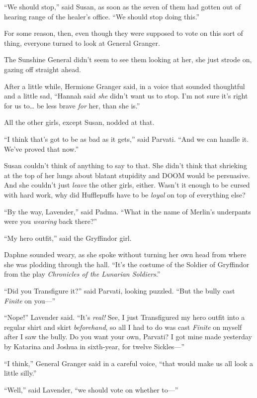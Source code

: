 ``We should stop,'' said Susan, as soon as the seven of them had gotten
out of hearing range of the healer's office. ``We should stop doing
this.''

For some reason, then, even though they were supposed to vote on this
sort of thing, everyone turned to look at General Granger.

The Sunshine General didn't seem to see them looking at her, she just
strode on, gazing off straight ahead.

After a little while, Hermione Granger said, in a voice that sounded
thoughtful and a little sad, ``Hannah said \emph{she} didn't want us to
stop. I'm not sure it's right for us to\ldots{} be less brave \emph{for}
her, than she is.''

All the other girls, except Susan, nodded at that.

``I think that's got to be as bad as it gets,'' said Parvati. ``And we
can handle it. We've proved that now.''

Susan couldn't think of anything to say to that. She didn't think that
shrieking at the top of her lungs about blatant stupidity and DOOM would
be persuasive. And she couldn't just \emph{leave} the other girls,
either. Wasn't it enough to be cursed with hard work, why did
Hufflepuffs have to be \emph{loyal} on top of everything else?

``By the way, Lavender,'' said Padma. ``What in the name of Merlin's
underpants were you \emph{wearing} back there?''

``My hero outfit,'' said the Gryffindor girl.

Daphne sounded weary, as she spoke without turning her own head from
where she was plodding through the hall. ``It's the costume of the
Soldier of Gryffindor from the play \emph{Chronicles of the Lunarian
Soldiers}.''

``Did you Transfigure it?'' said Parvati, looking puzzled. ``But the
bully cast \emph{Finite} on you---''

``Nope!'' Lavender said. ``It's \emph{real!} See, I just Transfigured my
hero outfit into a regular shirt and skirt \emph{beforehand}, so all I
had to do was cast \emph{Finite} on myself after I saw the bully. Do you
want your own, Parvati? I got mine made yesterday by Katarina and Joshua
in sixth-year, for twelve Sickles---''

``I think,'' General Granger said in a careful voice, ``that would make
us all look a little silly.''

``Well,'' said Lavender, ``we should vote on whether to---''


